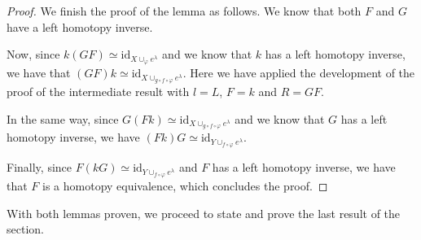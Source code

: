 \begin{proof}
    \bigskip

    We finish the proof of the lemma as follows. We know that both $F$ and $G$ have a left homotopy inverse.

    Now, since $k(GF)\simeq \text{id}_{X\cup_{\varphi} e^{\lambda}}$ and we know that $k$ has a left homotopy inverse, we have that $(GF)k\simeq \text{id}_{X\cup_{g\circ f\circ\varphi} e^{\lambda}}$. Here we have applied the development of the proof of the intermediate result with $l=L$, $F=k$ and $R=GF$.

    In the same way, since $G(Fk) \simeq \text{id}_{X\cup_{g\circ f\circ\varphi} e^{\lambda}}$ and we know that $G$ has a left homotopy inverse, we have $(Fk)G \simeq \text{id}_{Y\cup_{f\circ\varphi} e^{\lambda}}$.

    Finally, since $F(kG) \simeq \text{id}_{Y\cup_{f\circ\varphi} e^{\lambda}}$ and $F$ has a left homotopy inverse, we have that $F$ is a homotopy equivalence, which concludes the proof.
\end{proof}

With both lemmas proven, we proceed to state and prove the last result of the section.

